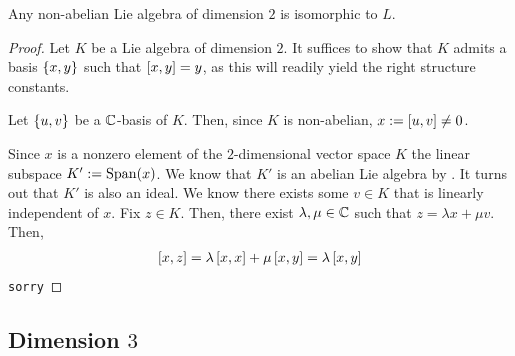 \begin{boxproposition}
    Any non-abelian Lie algebra of dimension $2$ is isomorphic to $L$.
\end{boxproposition}
\begin{proof}
    Let $K$ be a Lie algebra of dimension $2$. It suffices to show that $K$ admits a basis $\left\{ x, y \right\}$ such that $\left[ x, y \right] = y$, as this will readily yield the right structure constants.
    
    Let $\left\{ u, v \right\}$ be a $\mathbb{C}$-basis of $K$. Then, since $K$ is non-abelian, $x := \left[ u, v \right] \neq 0$.

    Since $x$ is a nonzero element of the $2$-dimensional vector space $K$ the linear subspace $K' := \operatorname{Span}\!\left( x \right)$. We know that $K'$ is an abelian Lie algebra by . It turns out that $K'$ is also an ideal. We know there exists some $v \in K$ that is linearly independent of $x$. Fix $z \in K$. Then, there exist $\lambda, \mu \in \mathbb{C}$ such that $z = \lambda x + \mu v$. Then,
    \begin{align*}
        \left[ x, z \right] = \lambda \left[ x, x \right] + \mu \left[ x, y \right] = \lambda \left[ x, y \right]
    \end{align*}
    \verb|sorry|
\end{proof}

\subsection{Dimension $3$}
